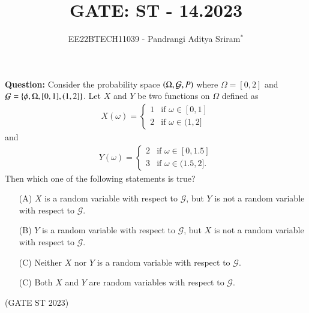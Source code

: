 \documentclass[journal,12pt,twocolumn]{IEEEtran}
\theoremstyle{remark}
\begin{document}

\vspace{3cm}

\title{GATE: ST - 14.2023}
\author{EE22BTECH11039 - Pandrangi Aditya Sriram$^{*}$%
}
\maketitle
\newpage
\bigskip

\renewcommand{\thefigure}{\theenumi}
\renewcommand{\thetable}{\theenumi}


\vspace{3cm}
\textbf{Question:} Consider the probability space $\left(\Omega, \mathcal{G}, P\right)$ where $\Omega = [0,2]$ and $\mathcal{G} = \left\{\phi, \Omega, [0,1], (1,2]\right\}$. Let $X$ and $Y$ be two functions on $\Omega$ defined as
\begin{align*}
    X(\omega) = 
    \begin{cases}
        1 & \text{if }\omega \in [0, 1]\\
        2 & \text{if }\omega \in (1, 2]
    \end{cases}
\end{align*}
and
\begin{align*}
    Y(\omega) = 
    \begin{cases}
        2 & \text{if }\omega \in [0, 1.5]\\
        3 & \text{if }\omega \in (1.5, 2].
    \end{cases}
\end{align*}
Then which one of the following statements is true?
\begin{enumerate}
    \item [(A)] $X$ is a random variable with respect to $\mathcal{G}$, but $Y$ is not a random variable with respect to $\mathcal{G}$.
    \item [(B)] $Y$ is a random variable with respect to $\mathcal{G}$, but $X$ is not a random variable with respect to $\mathcal{G}$.
    \item [(C)] Neither $X$ nor $Y$ is a random variable with respect to $\mathcal{G}$.
    \item [(C)] Both $X$ and $Y$ are random variables with respect to $\mathcal{G}$.
\end{enumerate} \hfill (GATE ST 2023)\\
\solution
\end{document}
